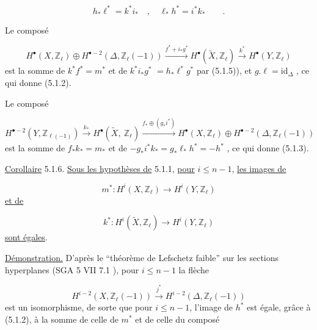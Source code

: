 \begin{equation}\tag{5.1.5}
h_*\ell^* = k^*i_* \quad , \quad \ell_*h^* = i^*k_* \qquad .
\end{equation}


Le composé

\begin{equation*}
H^{\bullet}(X,\mathbb{Z}_{\ell}) \oplus H^{\bullet-2}(\Delta,\mathbb{Z}_{\ell}(-1)) \stackrel{f^*+i_*g^*}{\longrightarrow} H^{\bullet}(\widetilde{X},\mathbb{Z}_{\ell}) \stackrel{k^*}{\longrightarrow} H^{\bullet}(Y,\mathbb{Z}_{\ell})
\end{equation*}
est la somme de $k^*f^* = m^*$ et de $k^*i_*g^*$ $= h_*\ell^*g^*$ par (5.1.5)), et $g.\ell = \mathrm{id}_{\Delta}$ , ce qui donne (5.1.2).

Le composé

\begin{equation*}
H^{\bullet-2}(Y,\mathbb{Z}_{\ell(-1)}) \stackrel{k_*}{\longrightarrow} H^{\bullet}(\widetilde{X},\ \mathbb{Z}_{\ell}) \stackrel{f_*\oplus(g_*i^*)}{\longrightarrow} H^{\bullet}(X,\mathbb{Z}_{\ell}) \oplus H^{\bullet-2}(\Delta,\mathbb{Z}_{\ell}(-1))
\end{equation*}
est la somme de $f_*k_* = m_*$ et de $-g_*i^*k_* = g_*\ell_*h^* = -h^*$ ,
ce qui donne (5.1.3).

\underline{Corollaire} 5.1.6. \underline{Sous les hypothèses de} 5.1.1, \underline{pour} $i \leq n-1$, \underline{les images de}

\begin{equation*}
m^* : H^i(X,\mathbb{Z}_{\ell}) \longrightarrow H^i(Y,\mathbb{Z}_{\ell})
\end{equation*}
\underline{et de}

\begin{equation*}
k^* : H^i(\widetilde{X},\mathbb{Z}_{\ell}) \longrightarrow H^i(Y,\mathbb{Z}_{\ell})
\end{equation*}
\underline{sont égales}.

\underline{Démonstration.} D'après le ``théorème de Lefschetz faible'' sur les sections hyperplanes (SGA 5 VII 7.1  ), pour $i \leq n-1$ la flèche

\begin{equation}\tag{5.1.7}
H^{i-2}(X,\mathbb{Z}_{\ell}(-1)) \stackrel{j^*}{\longrightarrow} H^{i-2}(\Delta,\mathbb{Z}_{\ell}(-1))
\end{equation}
est un isomorphisme, de sorte que pour $i \leq n-1$, l'image de $h^*$ est égale, grâce à (5.1.2), à la somme de celle de $m^*$ et de celle du composé

